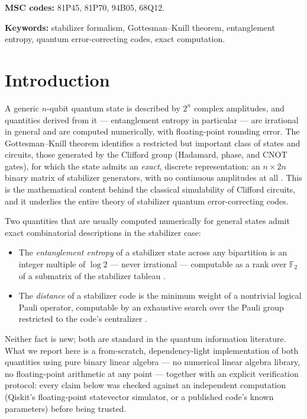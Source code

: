 \documentclass[11pt]{article}
\newcommand{\GF}{\mathbb{F}_2}
\begin{document}
\noindent \textbf{MSC codes:} 81P45, 81P70, 94B05, 68Q12.

\noindent \textbf{Keywords:} stabilizer formalism, Gottesman--Knill
theorem, entanglement entropy, quantum error-correcting codes, exact
computation.

\section{Introduction}

A generic $n$-qubit quantum state is described by $2^n$ complex
amplitudes, and quantities derived from it --- entanglement entropy in
particular --- are irrational in general and are computed numerically,
with floating-point rounding error. The Gottesman--Knill theorem
identifies a restricted but important class of states and circuits,
those generated by the Clifford group (Hadamard, phase, and CNOT gates),
for which the state admits an \emph{exact}, discrete representation: an
$n \times 2n$ binary matrix of stabilizer generators, with no continuous
amplitudes at all \cite{Gottesman1997,NielsenChuang}. This is the
mathematical content behind the classical simulability of Clifford
circuits, and it underlies the entire theory of stabilizer quantum
error-correcting codes.

Two quantities that are usually computed numerically for general
states admit exact combinatorial descriptions in the stabilizer case:

\begin{itemize}
\item The \emph{entanglement entropy} of a stabilizer state across any
  bipartition is an integer multiple of $\log 2$ --- never irrational
  --- computable as a rank over $\GF$ of a submatrix of the stabilizer
  tableau \cite{Fattal2004}.
\item The \emph{distance} of a stabilizer code is the minimum weight of
  a nontrivial logical Pauli operator, computable by an exhaustive
  search over the Pauli group restricted to the code's centralizer
  \cite{Gottesman1997}.
\end{itemize}

Neither fact is new; both are standard in the quantum information
literature. What we report here is a from-scratch, dependency-light
implementation of both quantities using pure binary linear algebra ---
no numerical linear algebra library, no floating-point arithmetic at any
point --- together with an explicit verification protocol: every claim
below was checked against an independent computation (Qiskit's
floating-point statevector simulator, or a published code's known
parameters) before being trusted.
\end{document}
